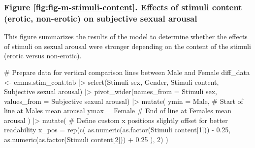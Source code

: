\documentclass[
  bookmarksnumbered]{article}
\newenvironment{Shaded}{\begin{snugshade}}{\end{snugshade}}
\newcommand{\AttributeTok}[1]{\textcolor[rgb]{0.80,0.80,0.80}{#1}}
\newcommand{\CommentTok}[1]{\textcolor[rgb]{0.50,0.62,0.50}{#1}}
\newcommand{\DecValTok}[1]{\textcolor[rgb]{0.86,0.86,0.80}{#1}}
\newcommand{\FloatTok}[1]{\textcolor[rgb]{0.75,0.75,0.82}{#1}}
\newcommand{\FunctionTok}[1]{\textcolor[rgb]{0.94,0.94,0.56}{#1}}
\newcommand{\NormalTok}[1]{\textcolor[rgb]{0.80,0.80,0.80}{#1}}
\newcommand{\OtherTok}[1]{\textcolor[rgb]{0.94,0.94,0.56}{#1}}
\newcommand{\SpecialCharTok}[1]{\textcolor[rgb]{0.86,0.64,0.64}{#1}}
\newcommand{\StringTok}[1]{\textcolor[rgb]{0.80,0.58,0.58}{#1}}
\begin{document}
\subsubsection{Figure \ref{fig:fig-m-stimuli-content}. Effects of stimuli content (erotic, non-erotic) on subjective sexual arousal}\label{figure-reffigfig-m-stimuli-content.-effects-of-stimuli-content-erotic-non-erotic-on-subjective-sexual-arousal}

This figure summarizes the results of the model to determine whether the effects of stimuli on sexual arousal were stronger depending on the content of the stimuli (erotic versus non-erotic).

\begin{Shaded}
\begin{Highlighting}[]
\CommentTok{\# Prepare data for vertical comparison lines between Male and Female}
\NormalTok{diff\_data }\OtherTok{\textless{}{-}}\NormalTok{ emms.stim\_cont.tab }\SpecialCharTok{|\textgreater{}}
  \FunctionTok{select}\NormalTok{(}\StringTok{\textasciigrave{}}\AttributeTok{Stimuli sex}\StringTok{\textasciigrave{}}\NormalTok{, Gender, }\StringTok{\textasciigrave{}}\AttributeTok{Stimuli content}\StringTok{\textasciigrave{}}\NormalTok{, }\StringTok{\textasciigrave{}}\AttributeTok{Subjective sexual arousal}\StringTok{\textasciigrave{}}\NormalTok{) }\SpecialCharTok{|\textgreater{}}
  \FunctionTok{pivot\_wider}\NormalTok{(}\AttributeTok{names\_from =} \StringTok{\textasciigrave{}}\AttributeTok{Stimuli sex}\StringTok{\textasciigrave{}}\NormalTok{, }\AttributeTok{values\_from =} \StringTok{\textasciigrave{}}\AttributeTok{Subjective sexual arousal}\StringTok{\textasciigrave{}}\NormalTok{) }\SpecialCharTok{|\textgreater{}}
  \FunctionTok{mutate}\NormalTok{(}
    \AttributeTok{ymin =}\NormalTok{ Male, }\CommentTok{\# Start of line at Male\textquotesingle{}s mean arousal}
    \AttributeTok{ymax =}\NormalTok{ Female }\CommentTok{\# End of line at Female\textquotesingle{}s mean arousal}
\NormalTok{  ) }\SpecialCharTok{|\textgreater{}}
  \FunctionTok{mutate}\NormalTok{(}
    \CommentTok{\# Define custom x positions slightly offset for better readability}
    \AttributeTok{x\_pos =} \FunctionTok{rep}\NormalTok{(}\FunctionTok{c}\NormalTok{(}
      \FunctionTok{as.numeric}\NormalTok{(}\FunctionTok{as.factor}\NormalTok{(}\StringTok{\textasciigrave{}}\AttributeTok{Stimuli content}\StringTok{\textasciigrave{}}\NormalTok{[}\DecValTok{1}\NormalTok{])) }\SpecialCharTok{{-}} \FloatTok{0.25}\NormalTok{,}
      \FunctionTok{as.numeric}\NormalTok{(}\FunctionTok{as.factor}\NormalTok{(}\StringTok{\textasciigrave{}}\AttributeTok{Stimuli content}\StringTok{\textasciigrave{}}\NormalTok{[}\DecValTok{2}\NormalTok{])) }\SpecialCharTok{+} \FloatTok{0.25}
\NormalTok{    ), }\DecValTok{2}\NormalTok{)}
\NormalTok{  )}


\end{Highlighting}
\end{Shaded}
\end{document}
